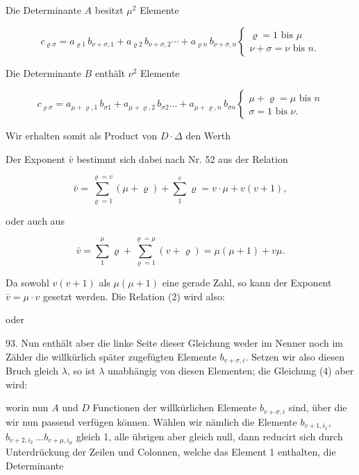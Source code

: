 Die Determinante $A$ besitzt $\mu^2$ Elemente

\[
c_{\varrho\sigma} = a_{\varrho 1}\, b_{\nu+\sigma,1} + a_{\varrho 2}\, b_{\nu+\sigma,2} \cdots + a_{\varrho n}\, b_{\nu+\sigma,n}
\begin{cases}
\varrho = 1 \text{ bis } \mu \\
\nu + \sigma = \nu \text{ bis } n.
\end{cases}
\]

Die Determinante $B$ enthält $\nu^2$ Elemente

\[
c_{\varrho\sigma} = a_{\mu+\varrho,1}\, b_{\sigma 1} + a_{\mu+\varrho,2}\, b_{\sigma 2} \ldots + a_{\mu+\varrho,n}\, b_{\sigma n}
\begin{cases}
\mu + \varrho = \mu \text{ bis } n \\
\sigma = 1 \text{ bis } \nu.
\end{cases}
\]


Wir erhalten somit als Product von $D \cdot \varDelta$ den Werth


Der Exponent $\bar v$ bestimmt sich dabei nach Nr. 52 aus der Relation

\[
\bar v = \sum_{\varrho=1}^{\varrho=v}(\mu+\varrho) + \sum_{1}^{v}\varrho = v\cdot\mu + v(v+1),
\]

oder auch aus

\[
\bar v = \sum_{1}^{\mu}\varrho + \sum_{\varrho=1}^{\varrho=\mu}(v+\varrho) = \mu(\mu+1) + v\mu.
\]

Da sowohl $v(v+1)$ als $\mu(\mu+1)$ eine gerade Zahl, so kann der Exponent $\bar v = \mu\cdot v$ gesetzt werden. Die Relation (2) wird also:


oder


93. Nun enth\"alt aber die linke Seite dieser Gleichung weder im Nenner noch im Z\"ahler die willk\"urlich sp\"ater zugef\"ugten Elemente $b_{v+\sigma,i}$. Setzen wir also diesen Bruch gleich $\lambda$, so ist $\lambda$ unabh\"angig von diesen Elementen; die Gleichung (4) aber wird:


worin nun $A$ und $D$ Functionen der willk\"urlichen Elemente $b_{v+\sigma,i}$ sind, \"uber die wir nun passend verf\"ugen k\"onnen. W\"ahlen wir n\"amlich die Elemente $b_{v+1,i_1}$, $b_{v+2,i_2}\ \ldots b_{v+\mu,i_\mu}$ gleich 1, alle \"ubrigen aber gleich null, dann reducirt sich durch Unterdr\"uckung der Zeilen und Colonnen, welche das Element 1 enthalten, die Determinante

